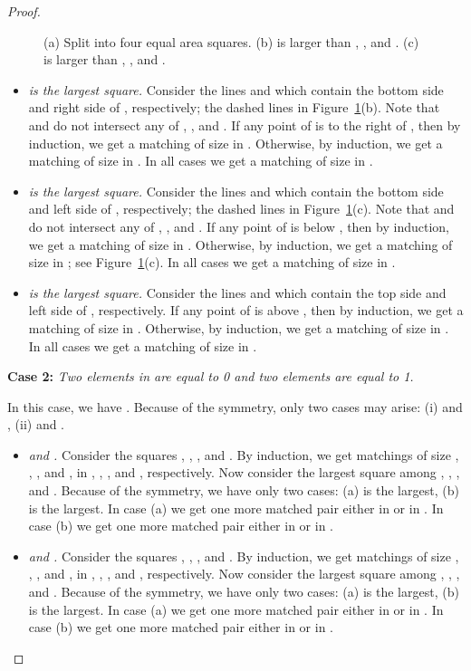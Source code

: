 \documentclass[11pt,a4paper]{article}
\begin{document}
\begin{proof}
\begin{figure}[htb]
  \caption{(a) Split  into four equal area squares. (b)  is larger than , , and . (c)  is larger than , , and .}
\label{square-fig1}
\end{figure}
\begin{itemize}
\item {\em  is the largest square.}
Consider the lines  and  which contain the bottom side and right side of , respectively; the dashed lines in Figure~\ref{square-fig1}(b). Note that  and  do not intersect any of , , and . If any point of  is to the right of , then by induction, we get a matching of size  in . Otherwise, by induction, we get a matching of size  in . In all cases we get a matching of size  in . 
\item {\em  is the largest square.}
Consider the lines  and  which contain the bottom side and left side of , respectively; the dashed lines in Figure~\ref{square-fig1}(c). Note that  and  do not intersect any of , , and . If any point of  is below , then by induction, we get a matching of size  in . Otherwise, by induction, we get a matching of size  in ; see Figure~\ref{square-fig1}(c). In all cases we get a matching of size  in . 

\item {\em  is the largest square.}
Consider the lines  and  which contain the top side and left side of , respectively. If any point of  is above , then by induction, we get a matching of size  in . Otherwise, by induction, we get a matching of size  in . In all cases we get a matching of size  in . 
\end{itemize}


{\bf Case 2:} {\em Two elements in  are equal to 0 and two elements are equal to 1.}

In this case, we have . Because of the symmetry, only two cases may arise: (i)  and , (ii)  and . 
\begin{itemize}
 \item {\em  and .}
Consider the squares , , , and . By induction, we get matchings of size , , , and , in , , , and , respectively. Now consider the largest square among , , , and . Because of the symmetry, we have only two cases: (a)  is the largest, (b)  is the largest. In case (a) we get one more matched pair either in  or in . In case (b) we get one more matched pair either in  or in .

 \item {\em  and .}
Consider the squares , , , and . By induction, we get matchings of size , , , and , in , , , and , respectively. Now consider the largest square among , , , and . Because of the symmetry, we have only two cases: (a)  is the largest, (b)  is the largest. In case (a) we get one more matched pair either in  or in . In case (b) we get one more matched pair either in  or in .
\end{itemize}
\end{proof}
\end{document}
